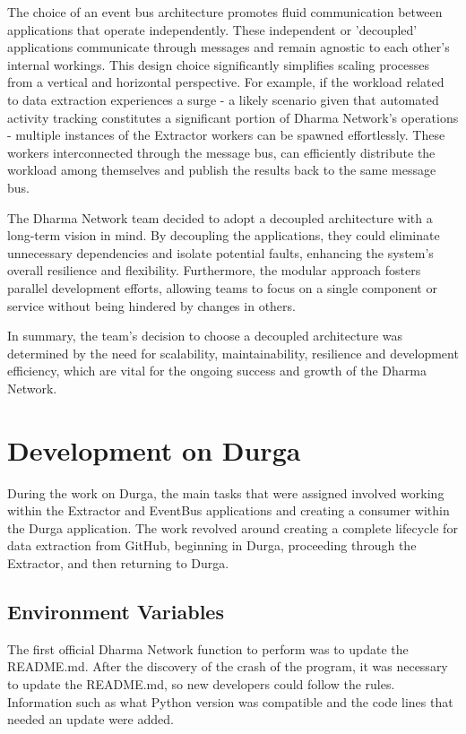 The choice of an event bus architecture promotes fluid communication between applications that operate independently. These independent or 'decoupled' applications communicate through messages and remain agnostic to each other's internal workings. This design choice significantly simplifies scaling processes from a vertical and horizontal perspective. For example, if the workload related to data extraction experiences a surge - a likely scenario given that automated activity tracking constitutes a significant portion of Dharma Network's operations - multiple instances of the Extractor workers can be spawned effortlessly. These workers interconnected through the message bus, can efficiently distribute the workload among themselves and publish the results back to the same message bus.\newline

The Dharma Network team decided to adopt a decoupled architecture with a long-term vision in mind. By decoupling the applications, they could eliminate unnecessary dependencies and isolate potential faults, enhancing the system's overall resilience and flexibility. Furthermore, the modular approach fosters parallel development efforts, allowing teams to focus on a single component or service without being hindered by changes in others.\newline

In summary, the team's decision to choose a decoupled architecture was determined by the need for scalability, maintainability, resilience and development efficiency, which are vital for the ongoing success and growth of the Dharma Network.

\section{Development on Durga}

During the work on Durga, the main tasks that were assigned involved working within the Extractor and EventBus applications and creating a consumer within the Durga application. The work revolved around creating a complete lifecycle for data extraction from GitHub, beginning in Durga, proceeding through the Extractor, and then returning to Durga.

\subsection{Environment Variables}

The first official Dharma Network function to perform was to update the README.md. After the discovery of the crash of the program, it was necessary to update the README.md, so new developers could follow the rules. Information such as what Python version was compatible and the code lines that needed an update were added.\newline

